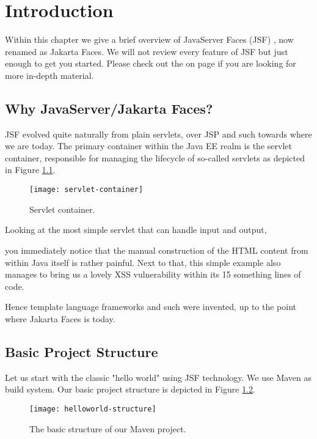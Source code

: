 %

\chapter{Introduction}
\label{chap:introduction}
Within this chapter we give a brief overview of JavaServer Faces (JSF) \cite{JSF23}, now renamed as Jakarta Faces.
We will not review every feature of JSF but just enough to get you started.
Please check out the  on page \pageref{chap:references} if you are looking for more in-depth material.

\section{Why JavaServer/Jakarta Faces?}
JSF evolved quite naturally from plain servlets, over JSP and such towards where we are today.
The primary container within the Java EE realm is the servlet container, responsible for managing the lifecycle of so-called servlets as depicted in Figure \ref{fig:servlet-container}.
\begin{figure}[htbp]
	\begin{center}
		\texttt{[image: servlet-container]}
		\caption{Servlet container.}
		\label{fig:servlet-container}
	\end{center}
\end{figure}
Looking at the most simple servlet that can handle input and output,

you immediately notice that the manual construction of the HTML content from within Java itself is rather painful.
Next to that, this simple example also manages to bring us a lovely XSS vulnerability within its 15 something lines of code.

Hence template language frameworks and such were invented, up to the point where Jakarta Faces is today.


\section{Basic Project Structure}
Let us start with the classic "hello world" using JSF technology.
We use Maven \cite{ApacheMaven} as build system.
Our basic project structure is depicted in Figure \ref{fig:helloworld-structure}.
\begin{figure}[htbp]
	\begin{center}
		\texttt{[image: helloworld-structure]}
		\caption{The basic structure of our Maven project.}
		\label{fig:helloworld-structure}
	\end{center}
\end{figure}

